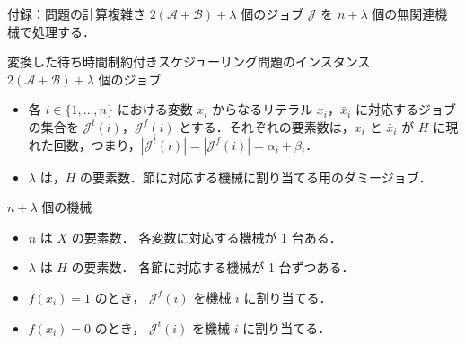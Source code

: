 \documentclass[dvipdfmx]{beamer}
\begin{document}
    \begin{frame}{付録：問題の計算複雑さ}
      $2(\mathcal{A} + \mathcal{B}) + \lambda$ 個のジョブ $\mathcal{J}$ を $n + \lambda$ 個の無関連機械で処理する．
      \begin{block}{変換した待ち時間制約付きスケジューリング問題のインスタンス}
        $2(\mathcal{A} + \mathcal{B}) + \lambda$ 個のジョブ
        \begin{itemize}
          \item 各 $i \in \{1,\ldots,n\}$ における変数 $x_i$ からなるリテラル $x_i$，$\bar x_i$ に対応するジョブの集合を $\mathcal{J}^t(i)$，$\mathcal{J}^f(i)$ とする．それぞれの要素数は，$x_i$ と $\bar x_i$ が $H$ に現れた回数，つまり，$|\mathcal{J}^t(i)| = |\mathcal{J}^f(i)| = \alpha_i + \beta_i$．
          \item $\lambda$ は，$H$ の要素数．節に対応する機械に割り当てる用のダミージョブ．
        \end{itemize}
        $n + \lambda$ 個の機械
        \begin{itemize}
          \item $n$ は $X$ の要素数．
          各変数に対応する機械が 1 台ある．
          \item $\lambda$ は $H$ の要素数．
          各節に対応する機械が 1 台ずつある．
        \end{itemize}
      \end{block}
      \begin{itemize}
        \item $f(x_i) = 1$ のとき，
        $\mathcal{J}^f(i)$ を機械 $i$ に割り当てる．
        \item $f(x_i) = 0$ のとき，
        $\mathcal{J}^t(i)$ を機械 $i$ に割り当てる．
      \end{itemize}
    \end{frame}
\end{document}
